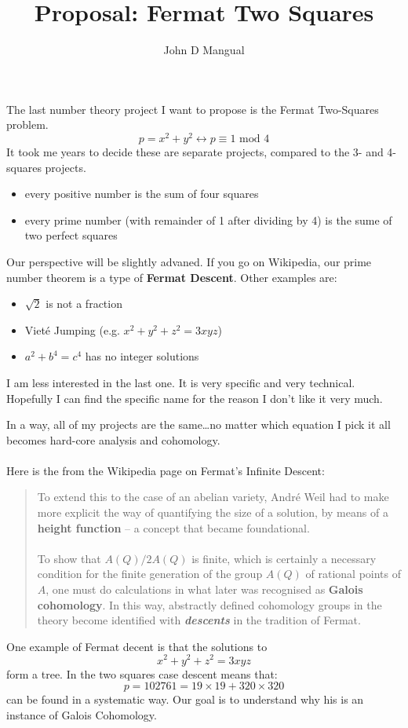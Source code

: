 \documentclass[12pt]{article}
\title{\textbf{Proposal: Fermat Two Squares}}
\author{John D Mangual}
\date{}
\begin{document}
\selectfont \fontsize{20}{25}\selectfont

\maketitle

\noindent The last number theory project I want to propose is the Fermat Two-Squares problem.
$$ p = x^2 + y^2 \longleftrightarrow p \equiv 1 \text{ mod }4 $$
It took me years to decide these are separate projects, compared to the 3- and 4- squares projects. 
\begin{itemize}
\item every positive number is the sum of four squares
\item every prime number (with remainder of 1 after dividing by 4) is the sume of two perfect squares
\end{itemize}
Our perspective will be slightly advaned.  If you go on Wikipedia, our prime number theorem is a type of \textbf{Fermat Descent}.  Other examples are:
\begin{itemize}
\item $\sqrt{2}$ is not a fraction
\item Viet\'{e} Jumping (e.g. $x^2 + y^2 + z^2 = 3xyz$)
\item $a^2 + b^4 = c^4$ has no integer solutions
\end{itemize}
I am less interested in the last one.  It is very specific and very technical.  Hopefully I can find the specific name for the reason I don't like it very much. 

\newpage

\noindent In a way, all of my projects are the same\dots no matter which equation I pick it all becomes hard-core analysis and cohomology. \\ \\
Here is the from the Wikipedia page on Fermat's Infinite Descent:
\begin{quotation}
{\color{blue} To extend this to the case of an abelian variety, Andr\'{e} Weil had to make more explicit the way of quantifying the size of a solution, by means of a \textbf{\color{black}height function} -- a concept that became foundational. \\\\ To show that $A(Q)/2A(Q)$ is finite, which is certainly a necessary condition for the finite generation of the group $A(Q)$ of rational points of $A$, one must do calculations in what later was recognised as \textbf{\color{black}Galois cohomology}. In this way, abstractly defined cohomology groups in the theory become identified with \textit{\color{green!85!white!90!black}\textbf{descents}} in the tradition of Fermat. }
\end{quotation}
One example of Fermat decent is that the solutions to 
$$ x^2 + y^2 + z^2 = 3xyz $$
form a tree.  In the two squares case descent means that:
$$ p = 102761 = 19 \times 19 + 320 \times 320 $$
can be found in a systematic way.  Our goal is to understand why his is an instance of Galois Cohomology.
\end{document}
